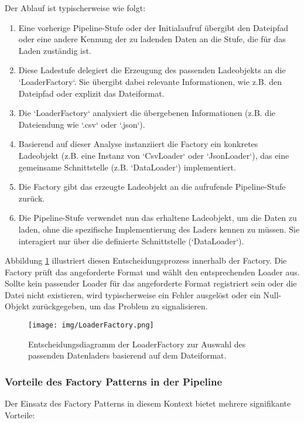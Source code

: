 \documentclass[a4paper]{article} %
\begin{document}
Der Ablauf ist typischerweise wie folgt:
\begin{enumerate}
    \item Eine vorherige Pipeline-Stufe oder der Initialaufruf übergibt den Dateipfad oder eine andere Kennung der zu ladenden Daten an die Stufe, die für das Laden zuständig ist.
    \item Diese Ladestufe delegiert die Erzeugung des passenden Ladeobjekts an die `LoaderFactory`. Sie übergibt dabei relevante Informationen, wie z.B. den Dateipfad oder explizit das Dateiformat.
    \item Die `LoaderFactory` analysiert die übergebenen Informationen (z.B. die Dateiendung wie `.csv` oder `.json`).
    \item Basierend auf dieser Analyse instanziiert die Factory ein konkretes Ladeobjekt (z.B. eine Instanz von `CsvLoader` oder `JsonLoader`), das eine gemeinsame Schnittstelle (z.B. `DataLoader`) implementiert.
    \item Die Factory gibt das erzeugte Ladeobjekt an die aufrufende Pipeline-Stufe zurück.
    \item Die Pipeline-Stufe verwendet nun das erhaltene Ladeobjekt, um die Daten zu laden, ohne die spezifische Implementierung des Laders kennen zu müssen. Sie interagiert nur über die definierte Schnittstelle (`DataLoader`).
\end{enumerate}

Abbildung \ref{fig:loaderFactory} illustriert diesen Entscheidungsprozess innerhalb der Factory. Die Factory prüft das angeforderte Format und wählt den entsprechenden Loader aus. Sollte kein passender Loader für das angeforderte Format registriert sein oder die Datei nicht existieren, wird typischerweise ein Fehler ausgelöst oder ein Null-Objekt zurückgegeben, um das Problem zu signalisieren.

\begin{figure}[htbp] %
    \centering %
    \texttt{[image: img/LoaderFactory.png]} %
    \caption{Entscheidungsdiagramm der LoaderFactory zur Auswahl des passenden Datenladers basierend auf dem Dateiformat.} %
    \label{fig:loaderFactory} %
\end{figure}

\subsubsection{Vorteile des Factory Patterns in der Pipeline}
Der Einsatz des Factory Patterns in diesem Kontext bietet mehrere signifikante Vorteile:
\end{document}
